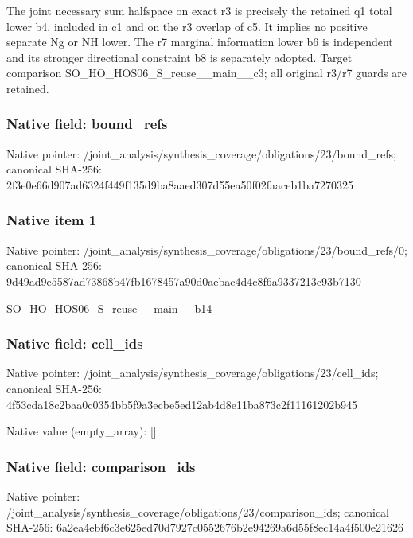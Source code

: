 \documentclass[10pt,a4paper]{article}
\begin{document}
\begingroup\raggedright\sloppy The joint necessary sum halfspace on exact r3 is precisely the retained q1 total lower b4,\allowbreak{} included in c1 and on the r3 overlap of c5. It implies no positive separate Ng or NH lower. The r7 marginal information lower b6 is independent and its stronger directional constraint b8 is separately adopted. Target comparison SO\_\allowbreak{}HO\_\allowbreak{}HOS06\_\allowbreak{}S\_\allowbreak{}reuse\_\allowbreak{}\_\allowbreak{}main\_\allowbreak{}\_\allowbreak{}c3;\allowbreak{} all original r3/\allowbreak{}r7 guards are retained.\par\endgroup

\subsubsection{Native field: bound\_\allowbreak{}refs}
Native pointer: /joint\_\allowbreak{}analysis/synthesis\_\allowbreak{}coverage/obligations/23/bound\_\allowbreak{}refs; canonical SHA-256: 2f3e0e66d907ad6324f449f135d9ba8aaed307d55ea50f02faaceb1ba7270325

\subsubsection{Native item 1}
Native pointer: /joint\_\allowbreak{}analysis/synthesis\_\allowbreak{}coverage/obligations/23/bound\_\allowbreak{}refs/0; canonical SHA-256: 9d49ad9e5587ad73868b47fb1678457a90d0aebac4d4c8f6a9337213c93b7130

\begingroup\raggedright\sloppy SO\_\allowbreak{}HO\_\allowbreak{}HOS06\_\allowbreak{}S\_\allowbreak{}reuse\_\allowbreak{}\_\allowbreak{}main\_\allowbreak{}\_\allowbreak{}b14\par\endgroup

\subsubsection{Native field: cell\_\allowbreak{}ids}
Native pointer: /joint\_\allowbreak{}analysis/synthesis\_\allowbreak{}coverage/obligations/23/cell\_\allowbreak{}ids; canonical SHA-256: 4f53cda18c2baa0c0354bb5f9a3ecbe5ed12ab4d8e11ba873c2f11161202b945

Native value (empty\_\allowbreak{}array): []

\subsubsection{Native field: comparison\_\allowbreak{}ids}
Native pointer: /joint\_\allowbreak{}analysis/synthesis\_\allowbreak{}coverage/obligations/23/comparison\_\allowbreak{}ids; canonical SHA-256: 6a2ea4ebf6c3e625ed70d7927c0552676b2e94269a6d55f8ec14a4f500e21626
\end{document}
